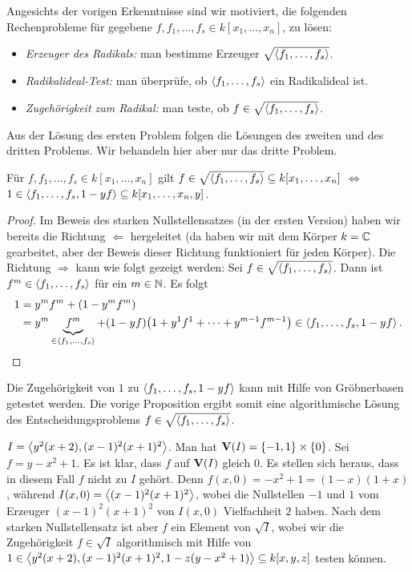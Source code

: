 \documentclass[11pt]{article}
\numberwithin{equation}{section}
\begin{document}
Angesichts der vorigen Erkenntnisse sind wir motiviert, die folgenden  Rechenprobleme für gegebene $f,f_1,\ldots,f_s \in k[x_1,\ldots,x_n]$, zu lösen: 

\begin{itemize} 
	\item \emph{Erzeuger des Radikals:} man bestimme  Erzeuger $\sqrt{\left< f_1,\ldots,f_s \right>}$. 
	\item \emph{Radikalideal-Test:} man überprüfe, ob $\left< f_1,\ldots,f_s \right>$ ein Radikalideal ist. 
	\item \emph{Zugehörigkeit zum Radikal:} man teste, ob $f \in \sqrt{ \left< f_1,\ldots,f_s \right>}$. 
\end{itemize} 

Aus der Lösung des ersten Problem folgen die Lösungen des zweiten und des dritten Problems. Wir behandeln hier aber nur das dritte Problem. 

\begin{proposition} 
	Für $f, f_1,\ldots,f_s \in k[x_1,\ldots,x_n]$ gilt $f \in \sqrt{\left< f_1,\ldots,f_s \right>} \subseteq k[x_1,\ldots,x_n]$ $\Longleftrightarrow$ $1 \in \left< f_1,\ldots,f_s, 1 - y f \right> \subseteq k[x_1,\ldots,x_n,y]$. 
\end{proposition} 
\begin{proof}
	Im Beweis des starken Nullstellensatzes (in der ersten Version) haben wir bereits die Richtung $\Longleftarrow$ hergeleitet (da haben wir mit dem Körper $k=\mathbb{C}$ gearbeitet, aber der Beweis dieser Richtung funktioniert für jeden Körper). Die Richtung $\Longrightarrow$ kann wie folgt gezeigt werden: Sei $f \in \sqrt{\left< f_1,\ldots,f_s \right>}$. Dann ist $f^m \in \left< f_1,\ldots,f_s \right>$ für ein $m \in \mathbb{N}$. Es folgt 
	\begin{align*}
		1 & = y^m f^m  + (1- y^m f^m) 
		\\ & = y^m \underbrace{f^m}_{\in \left< f_1,\ldots,f_s \right>} + (1 - y f) \bigl (1 + y^1 f^1 + \cdots + y^{m-1} f^{m-1} \bigr) \in \left< f_1,\ldots,f_s, 1- yf \right>. 
	\end{align*}
\end{proof} 

Die Zugehörigkeit von $1$ zu $\left< f_1,\ldots,f_s, 1 -yf \right>$ kann mit Hilfe von Gröbnerbasen getestet werden. Die vorige Proposition ergibt somit eine algorithmische Lösung des Entscheidungsproblems $f \in \sqrt{ \left< f_1,\ldots,f_s \right>}$. 

\begin{beispiel}
	$I = \left<  y^2 (x+2), (x-1)^2 (x+1)^2 \right>$. Man hat $\mathbf{V}(I) =  \{-1,1\} \times \{0\}$. Sei $f = y - x^2 + 1$. Es ist klar, dass $f$ auf $\mathbf{V}(I)$ gleich $0$. Es stellen sich heraus, dass in diesem Fall $f$ nicht zu $I$ gehört. Denn $f(x,0) = - x^2 + 1 = (1-x) (1+x)$, während $I(x,0) = \left<  (x-1)^2 (x+1)^2 \right>$, wobei die Nullstellen $-1$ und $1$ vom Erzeuger $(x-1)^2 (x+1)^2$ von $I(x,0)$ Vielfachheit $2$ haben. Nach dem starken Nullstellensatz ist aber $f$ ein Element von $\sqrt{I}$, wobei wir die Zugehörigkeit $f \in \sqrt{I}$ algorithmisch mit Hilfe von $1 \in \left<  y^2 (x+2), (x-1)^2(x+1)^2, 1 - z (y-x^2 + 1) \right> \subseteq k[x,y,z]$ testen können. 
\end{beispiel} 
\end{document}
